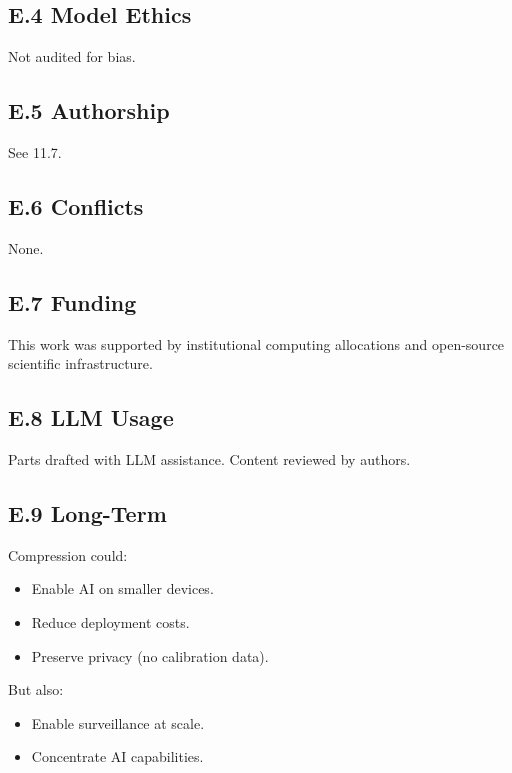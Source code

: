 \subsection{E.4 Model Ethics}

Not audited for bias.

\subsection{E.5 Authorship}

See  11.7.

\subsection{E.6 Conflicts}

None.

\subsection{E.7 Funding}

This work was supported by institutional computing allocations and open-source scientific infrastructure.

\subsection{E.8 LLM Usage}

Parts drafted with LLM assistance. Content reviewed by authors.

\subsection{E.9 Long-Term}

Compression could:
\begin{itemize}
\item Enable AI on smaller devices.
\item Reduce deployment costs.
\item Preserve privacy (no calibration data).

\end{itemize}
But also:
\begin{itemize}
\item Enable surveillance at scale.
\item Concentrate AI capabilities.

\end{itemize}

